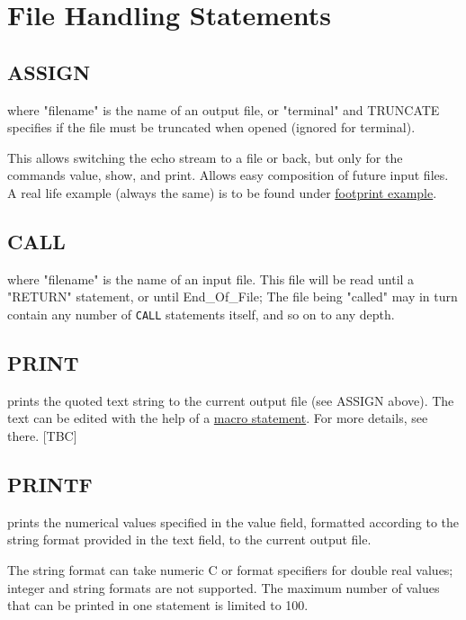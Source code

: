 \chapter{File Handling Statements}
\label{chap:files}

\section{ASSIGN}
\label{sec:assign}

where "filename" is the name of an output file, or "terminal" and
TRUNCATE specifies if the file must be truncated when opened (ignored
for terminal). 

This allows switching the echo stream to a file or back,
but only for the commands value, show, and print. Allows easy
composition of future \madx input files. A real life example (always the
same) is to be found under \href{foot.html}{footprint example}.  

\section{CALL}
\label{sec:call}
where "filename"  is the name of an input file. This file will be read
until a "RETURN" statement, or until End\_Of\_File; The file being
"called" may in turn contain any number of \texttt{CALL} statements
itself, and so on to any depth.  



\section{PRINT}
\label{sec:print}
prints the quoted text string to the current output file (see ASSIGN
above). The text can be edited with the help of a
\href{special.html#macro}{macro statement}. For more details, see
there. [TBC]  


\section{PRINTF}
\label{sec:printf}
prints the numerical values specified in the value field, formatted
according to the string format provided in the text field, to the
current output file.  

The string format can take numeric C or \madx format specifiers for
double real values; integer and string formats are not supported. 
The maximum number of values that can be printed in one
statement is limited to 100. 

